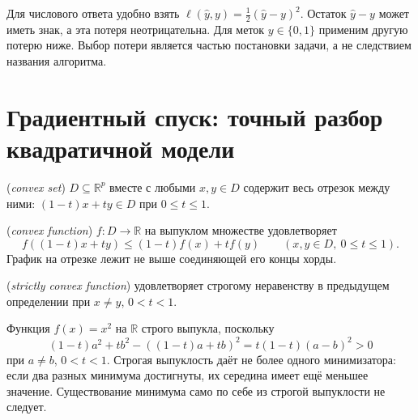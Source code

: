 \ifdim\dimexpr\ht\CatFlowBox+\dp\CatFlowBox\relax<58mm\dp\CatFlowBox=\dimexpr58mm-\ht\CatFlowBox\relax\fi%
\noindent\usebox{\CatFlowBox}\par\addvspace{2pt}
Для числового ответа удобно взять \(\ell(\widehat y,y)=\frac12(\widehat y-y)^2\). Остаток \(\widehat y-y\) может иметь знак, а эта потеря неотрицательна. Для меток \(y\in\{0,1\}\) применим другую потерю ниже. Выбор потери является частью постановки задачи, а не следствием названия алгоритма.
\section{Градиентный спуск: точный разбор квадратичной модели}
\begin{definition} (\emph{convex set}) \(D\subseteq\mathbb R^p\) вместе с любыми \(x,y\in D\) содержит весь отрезок между ними: \((1-t)x+ty\in D\) при \(0\le t\le1\).\end{definition}
\begin{definition} (\emph{convex function}) \(f:D\to\mathbb R\) на выпуклом множестве удовлетворяет
\[f((1-t)x+ty)\le(1-t)f(x)+tf(y)\qquad(x,y\in D,\ 0\le t\le1).\]
График на отрезке лежит не выше соединяющей его концы хорды.\end{definition}
\begin{definition} (\emph{strictly convex function}) удовлетворяет строгому неравенству в предыдущем определении при \(x\ne y\), \(0<t<1\).\end{definition}
\begin{example}Функция \(f(x)=x^2\) на \(\mathbb R\) строго выпукла, поскольку
\[(1-t)a^2+tb^2-((1-t)a+tb)^2=t(1-t)(a-b)^2>0\]
при \(a\ne b\), \(0<t<1\). Строгая выпуклость даёт не более одного минимизатора: если два разных минимума достигнуты, их середина имеет ещё меньшее значение. Существование минимума само по себе из строгой выпуклости не следует.\end{example}

